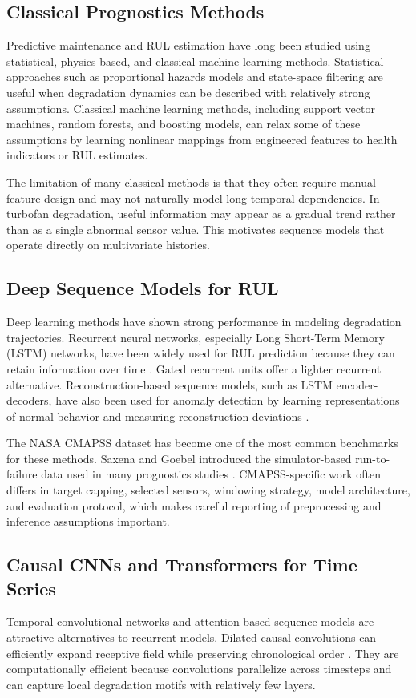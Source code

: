 \documentclass[11pt,a4paper]{article}
\begin{document}
\subsection{Classical Prognostics Methods}
Predictive maintenance and RUL estimation have long been studied using statistical, physics-based, and classical machine learning methods. Statistical approaches such as proportional hazards models and state-space filtering are useful when degradation dynamics can be described with relatively strong assumptions. Classical machine learning methods, including support vector machines, random forests, and boosting models, can relax some of these assumptions by learning nonlinear mappings from engineered features to health indicators or RUL estimates.

The limitation of many classical methods is that they often require manual feature design and may not naturally model long temporal dependencies. In turbofan degradation, useful information may appear as a gradual trend rather than as a single abnormal sensor value. This motivates sequence models that operate directly on multivariate histories.

\subsection{Deep Sequence Models for RUL}
Deep learning methods have shown strong performance in modeling degradation trajectories. Recurrent neural networks, especially Long Short-Term Memory (LSTM) networks, have been widely used for RUL prediction because they can retain information over time \citep{zheng2017long}. Gated recurrent units offer a lighter recurrent alternative. Reconstruction-based sequence models, such as LSTM encoder-decoders, have also been used for anomaly detection by learning representations of normal behavior and measuring reconstruction deviations \citep{malhotra2016lstm}.

The NASA CMAPSS dataset has become one of the most common benchmarks for these methods. Saxena and Goebel introduced the simulator-based run-to-failure data used in many prognostics studies \citep{saxena2008damage}. CMAPSS-specific work often differs in target capping, selected sensors, windowing strategy, model architecture, and evaluation protocol, which makes careful reporting of preprocessing and inference assumptions important.

\subsection{Causal CNNs and Transformers for Time Series}
Temporal convolutional networks and attention-based sequence models are attractive alternatives to recurrent models. Dilated causal convolutions can efficiently expand receptive field while preserving chronological order \citep{bai2018empirical}. They are computationally efficient because convolutions parallelize across timesteps and can capture local degradation motifs with relatively few layers.
\end{document}
